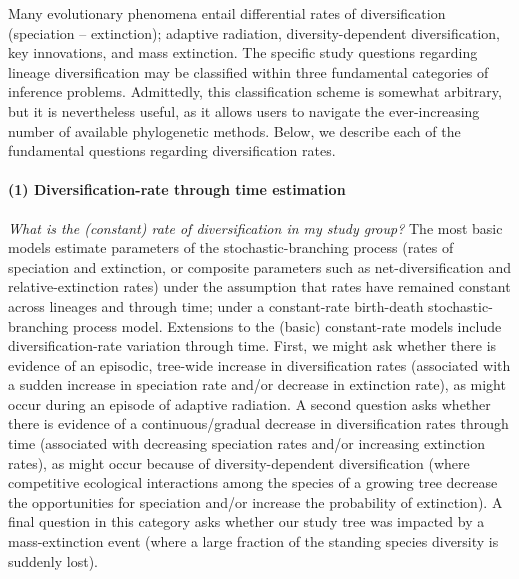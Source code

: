Many evolutionary phenomena entail differential rates of diversification (speciation -- extinction); \EG adaptive radiation, diversity-dependent diversification, key innovations, and mass extinction.
The specific study questions regarding lineage diversification may be classified within three fundamental categories of inference problems.
Admittedly, this classification scheme is somewhat arbitrary, but it is nevertheless useful, as it allows users to navigate the ever-increasing number of available phylogenetic methods.
Below, we describe each of the fundamental questions regarding diversification rates.

\paragraph{(1) Diversification-rate through time estimation}\textit{What is the (constant) rate of diversification in my study group?} 
The most basic models estimate parameters of the stochastic-branching process (\IE rates of speciation and extinction, or composite parameters such as net-diversification and relative-extinction rates) under the assumption that rates have remained constant across lineages and through time; \IE under a constant-rate birth-death stochastic-branching process model.
Extensions to the (basic) constant-rate models include diversification-rate variation through time.
First, we might ask whether there is evidence of an episodic, tree-wide increase in diversification rates (associated with a sudden increase in speciation rate and/or decrease in extinction rate), as might occur during an episode of adaptive radiation.
A second question asks whether there is evidence of a continuous/gradual decrease in diversification rates through time (associated with decreasing speciation rates and/or increasing extinction rates), as might occur because of diversity-dependent diversification (\IE where competitive ecological interactions among the species of a growing tree decrease the opportunities for speciation and/or increase the probability of extinction).
A final question in this category asks whether our study tree was impacted by a mass-extinction event (where a large fraction of the standing species diversity is suddenly lost).



